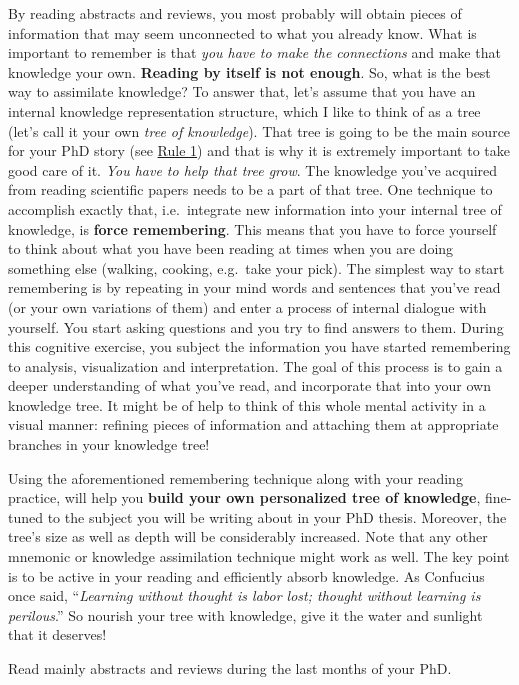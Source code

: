 \documentclass[
  12pt,
]{book}
\begin{document}
By reading abstracts and reviews, you most probably will obtain pieces of information that may seem unconnected to what you already know.
What is important to remember is that \emph{you have to make the connections} and make that knowledge your own.
\textbf{Reading by itself is not enough}.
So, what is the best way to assimilate knowledge?
To answer that, let's assume that you have an internal knowledge representation structure, which I like to think of as a tree (let's call it your own \emph{tree of knowledge}).
That tree is going to be the main source for your PhD story (see \protect\hyperlink{rule1}{Rule 1}) and that is why it is extremely important to take good care of it.
\emph{You have to help that tree grow}.
The knowledge you've acquired from reading scientific papers needs to be a part of that tree.
One technique to accomplish exactly that, i.e.~integrate new information into your internal tree of knowledge, is \textbf{force remembering}.
This means that you have to force yourself to think about what you have been reading at times when you are doing something else (walking, cooking, e.g.~take your pick).
The simplest way to start remembering is by repeating in your mind words and sentences that you've read (or your own variations of them) and enter a process of internal dialogue with yourself.
You start asking questions and you try to find answers to them.
During this cognitive exercise, you subject the information you have started remembering to analysis, visualization and interpretation.
The goal of this process is to gain a deeper understanding of what you've read, and incorporate that into your own knowledge tree.
It might be of help to think of this whole mental activity in a visual manner: refining pieces of information and attaching them at appropriate branches in your knowledge tree!

Using the aforementioned remembering technique along with your reading practice, will help you \textbf{build your own personalized tree of knowledge}, fine-tuned to the subject you will be writing about in your PhD thesis.
Moreover, the tree's size as well as depth will be considerably increased.
Note that any other mnemonic or knowledge assimilation technique might work as well.
The key point is to be active in your reading and efficiently absorb knowledge.
As Confucius once said, ``\emph{Learning without thought is labor lost; thought without learning is perilous}.''
So nourish your tree with knowledge, give it the water and sunlight that it deserves!

Read mainly abstracts and reviews during the last months of your PhD.
\end{document}
